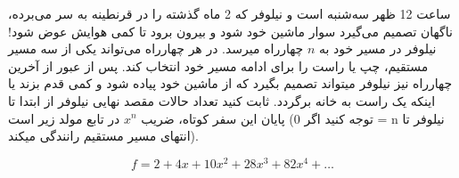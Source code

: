 \p
    ساعت 12 ظهر سه‌شنبه است و نیلوفر که 2 ماه گذشته را در قرنطینه به سر می‌برده، ناگهان تصمیم می‌گیرد سوار ماشین خود شود و بیرون برود تا کمی هوایش عوض شود!
    نیلوفر در مسیر خود به
    $n$
    چهارراه میرسد.
    در هر چهارراه می‌تواند یکی از سه مسیر مستقیم، چپ یا راست را برای ادامه مسیر خود انتخاب کند. پس از عبور از آخرین چهارراه نیز نیلوفر میتواند تصمیم بگیرد که از ماشین خود پیاده شود و کمی قدم بزند یا اینکه یک راست به خانه برگردد. ثابت کنید تعداد حالات مقصد نهایی نیلوفر از ابتدا تا پایان این سفر کوتاه، ضریب
    $x^n$
    در تابع مولد زیر است
    (توجه کنید اگر 0 = n نیلوفر تا انتهای مسیر مستقیم رانندگی میکند).
    
    $$f = 2 + 4x + 10x^2 + 28x^3 + 82x^4 + \ldots$$
